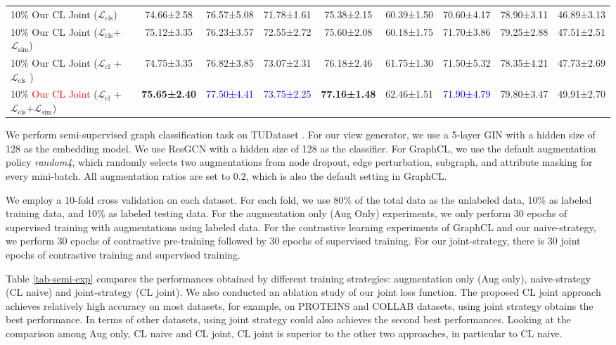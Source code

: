 \begin{table*}
{\begin{tabular}{lcccccccc}
        10\%   Our CL Joint ($\mathcal{L}_\text{cls}$) & 74.66±2.58 & 76.57±5.08 & 71.78±1.61 & 75.38±2.15 & 60.39±1.50 & 70.60±4.17 & 78.90±3.11 & 46.89±3.13 \\
        10\%   Our CL Joint ($\mathcal{L}_\text{cls}$+$\mathcal{L}_\text{sim}$)     & 75.12±3.35 & 76.23±3.57 & 72.55±2.72 & 75.60±2.08 & 60.18±1.75 & 71.70±3.86 & 79.25±2.88 & 47.51±2.51 \\
        10\%   Our CL Joint ($\mathcal{L}_\text{cl}$ +$\mathcal{L}_\text{cls}$ )     & 74.75±3.35 & 76.82±3.85 & 73.07±2.31 & 76.18±2.46 & 61.75±1.30 & 71.50±5.32 & 78.35±4.21 & 47.73±2.69 \\
        10\%   \textcolor{red}{Our CL Joint} ($\mathcal{L}_\text{cl}$ +$\mathcal{L}_\text{cls}$+$\mathcal{L}_\text{sim}$)     & \textbf{75.65±2.40} & \textcolor{blue}{77.50±4.41} & \textcolor{blue}{73.75±2.25} & \textbf{77.16±1.48} & 62.46±1.51 & \textcolor{blue}{71.90±4.79} & 79.80±3.47 & 49.91±2.70 \\
        \hline
        \end{tabular}
        }
    \vspace{-0.5cm}
    \label{tab-semi-exp}
\end{table*}

We perform semi-supervised graph classification task on TUDataset \cite{morris2020tudataset}. %
For our view generator, we use a 5-layer GIN with a hidden size of 128 as the embedding model. We use ResGCN  with a hidden size of 128 as the classifier. For GraphCL, we use the default augmentation policy \emph{random4}, which randomly selects two augmentations from node dropout, edge perturbation, subgraph, and attribute masking for every mini-batch. All augmentation ratios are set to $0.2$, which is also the default setting in GraphCL.

We employ a 10-fold cross validation on each dataset. For each fold, we use 80\% of the total data as the unlabeled data, 10\% as labeled training data, and 10\% as labeled testing data. For the augmentation only (Aug Only) experiments, we only perform 30 epochs of supervised training with augmentations using labeled data. For the contrastive learning experiments of GraphCL and our naive-strategy, we perform 30 epochs of contrastive pre-training followed by 30 epochs of supervised training. For our joint-strategy, there is 30 joint epochs of contrastive training and supervised training. 

Table \ref{tab-semi-exp} compares the performances obtained by different training strategies: augmentation only (Aug only), naive-strategy 
(CL naive) and joint-strategy (CL joint). We also conducted an ablation study of our joint loss function. The proposed CL joint approach achieves relatively high accuracy on most datasets, for example, on PROTEINS and COLLAB datasets, using joint strategy obtains the best performance. In terms of other datasets, using joint strategy could also achieves the second best performances. Looking at the comparison among Aug only, CL naive and CL joint, CL joint is superior to the other two approaches, in particular to CL naive. 

